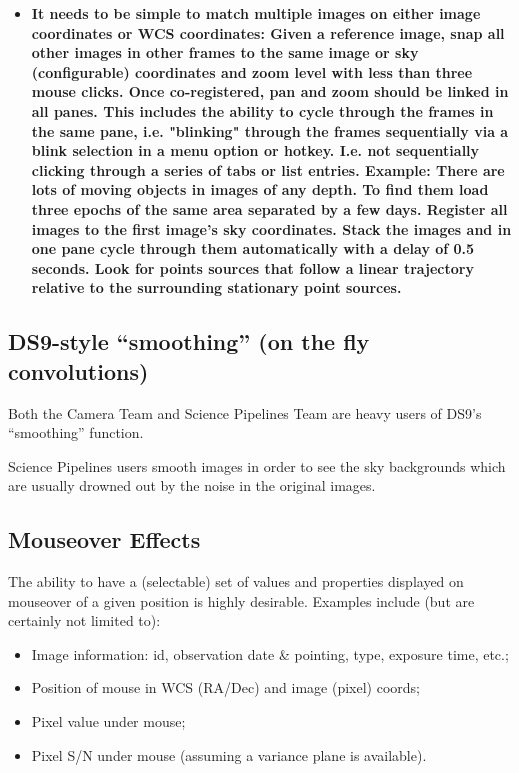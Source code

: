\begin{itemize}
\item{\bf{It needs to be simple to match multiple images on either image coordinates or WCS coordinates}:
Given a reference image, snap all other images in other frames to the same image or sky (configurable) coordinates and zoom level with less than three mouse clicks.
Once co-registered, pan and zoom should be linked in all panes.
This includes the ability to cycle through the frames in the same pane, i.e. "blinking" through the frames sequentially via a blink selection in a menu option or hotkey.  I.e. not sequentially clicking through a series of tabs or list entries.
Example: There are lots of moving objects in images of any depth.  To find them load three epochs of the same area separated by a few days.  Register all images to the first image's sky coordinates.  Stack the images and in one pane cycle through them automatically with a delay of 0.5 seconds.  Look for points sources that follow a linear trajectory relative to the surrounding stationary point sources.}
\end{itemize}

\subsection{DS9-style ``smoothing'' (on the fly convolutions)}
Both the Camera Team and Science Pipelines Team are heavy users of DS9's ``smoothing'' function.

Science Pipelines users smooth images in order to see the sky backgrounds which are usually drowned out by the noise in the original images. 


\subsection{Mouseover Effects}
The ability to have a (selectable) set of values and properties displayed on mouseover of a given position is highly desirable.  Examples include (but are certainly not limited to):
\begin{itemize}
\item{Image information: id, observation date \& pointing, type, exposure time, etc.;}
\item{Position of mouse in WCS (RA/Dec) and image (pixel) coords;}
\item{Pixel value under mouse;}
\item{Pixel S/N under mouse (assuming a variance plane is available).}
\end{itemize}

